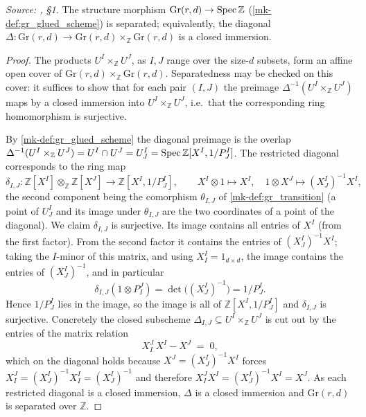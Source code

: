 \begin{lemma}\label{mk-lem:gr_separated}
  \leanok

  \textit{Source: \cite{nitsure-hilbert-quot}, \S 1.}
  The structure morphism \(\mathrm{Gr}(r,d) \to \operatorname{Spec} \mathbb{Z}\)
  (\ref{mk-def:gr_glued_scheme}) is separated; equivalently, the diagonal
  \(\Delta : \mathrm{Gr}(r,d) \to \mathrm{Gr}(r,d) \times_{\mathbb{Z}}
  \mathrm{Gr}(r,d)\) is a closed immersion.
\end{lemma}
\begin{proof}
  \leanok
  The products \(U^I \times_{\mathbb{Z}} U^J\), as \(I, J\) range over the
  size-\(d\) subsets, form an affine open cover of \(\mathrm{Gr}(r,d)
  \times_{\mathbb{Z}} \mathrm{Gr}(r,d)\). Separatedness may be checked on this
  cover: it suffices to show that for each pair \((I,J)\) the preimage
  \(\Delta^{-1}(U^I \times_{\mathbb{Z}} U^J)\) maps by a closed immersion into
  \(U^I \times_{\mathbb{Z}} U^J\), i.e.\ that the corresponding ring
  homomorphism is surjective.

  By \ref{mk-def:gr_glued_scheme} the diagonal preimage is the overlap
  \(\Delta^{-1}(U^I \times_{\mathbb{Z}} U^J) = U^I \cap U^J = U^I_J = \operatorname{Spec}
  \mathbb{Z}[X^I, 1/P^I_J]\). The restricted diagonal corresponds to the ring map
  \[
    \delta_{I,J} : \mathbb{Z}[X^I] \otimes_{\mathbb{Z}} \mathbb{Z}[X^J]
    \longrightarrow \mathbb{Z}[X^I, 1/P^I_J],
    \qquad
    X^I \otimes 1 \mapsto X^I, \quad 1 \otimes X^J \mapsto (X^I_J)^{-1} X^I,
  \]
  the second component being the comorphism \(\theta_{I,J}\) of
  \ref{mk-def:gr_transition} (a point of \(U^I_J\) and its image under
  \(\theta_{I,J}\) are the two coordinates of a point of the diagonal). We claim
  \(\delta_{I,J}\) is surjective. Its image contains all entries of \(X^I\)
  (from the first factor). From the second factor it contains the entries of
  \((X^I_J)^{-1} X^I\); taking the \(I\)-minor of this matrix, and using
  \(X^I_I = 1_{d\times d}\), the image contains the entries of \((X^I_J)^{-1}\),
  and in particular
  \[
    \delta_{I,J}(1 \otimes P^J_I) = \det\bigl((X^I_J)^{-1}\bigr) = 1/P^I_J .
  \]
  Hence \(1/P^I_J\) lies in the image, so the image is all of
  \(\mathbb{Z}[X^I, 1/P^I_J]\) and \(\delta_{I,J}\) is surjective. Concretely the
  closed subscheme \(\Delta_{I,J} \subseteq U^I \times_{\mathbb{Z}} U^J\) is cut
  out by the entries of the matrix relation
  \[
    X^J_I \, X^I - X^J \;=\; 0,
  \]
  which on the diagonal holds because \(X^J = (X^I_J)^{-1} X^I\) forces
  \(X^J_I = (X^I_J)^{-1} X^I_I = (X^I_J)^{-1}\) and therefore \(X^J_I X^I =
  (X^I_J)^{-1} X^I = X^J\). As each restricted diagonal is a closed immersion,
  \(\Delta\) is a closed immersion and \(\mathrm{Gr}(r,d)\) is separated over
  \(\mathbb{Z}\).
\end{proof}

